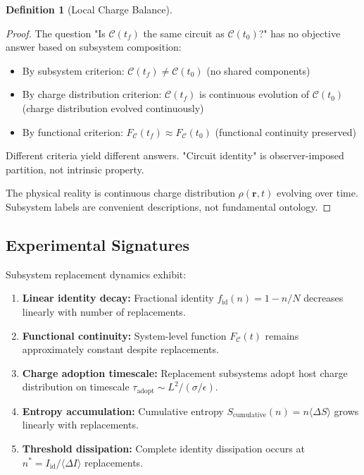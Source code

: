 \documentclass[12pt,a4paper]{article}
\theoremstyle{plain}
\theoremstyle{definition}
\newtheorem{definition}[theorem]{Definition}
\theoremstyle{remark}
\begin{document}
\begin{definition}[Local Charge Balance]
\begin{proof}
The question "Is $\mathcal{C}(t_f)$ the same circuit as $\mathcal{C}(t_0)$?" has no objective answer based on subsystem composition:
\begin{itemize}
\item By subsystem criterion: $\mathcal{C}(t_f) \neq \mathcal{C}(t_0)$ (no shared components)
\item By charge distribution criterion: $\mathcal{C}(t_f)$ is continuous evolution of $\mathcal{C}(t_0)$ (charge distribution evolved continuously)
\item By functional criterion: $F_{\mathcal{C}}(t_f) \approx F_{\mathcal{C}}(t_0)$ (functional continuity preserved)
\end{itemize}

Different criteria yield different answers. "Circuit identity" is observer-imposed partition, not intrinsic property.

The physical reality is continuous charge distribution $\rho(\mathbf{r},t)$ evolving over time. Subsystem labels are convenient descriptions, not fundamental ontology.
\end{proof}

\subsection{Experimental Signatures}

Subsystem replacement dynamics exhibit:

\begin{enumerate}
\item \textbf{Linear identity decay:} Fractional identity $f_{\text{id}}(n) = 1 - n/N$ decreases linearly with number of replacements.

\item \textbf{Functional continuity:} System-level function $F_{\mathcal{C}}(t)$ remains approximately constant despite replacements.

\item \textbf{Charge adoption timescale:} Replacement subsystems adopt host charge distribution on timescale $\tau_{\text{adopt}} \sim L^2 / (\sigma/\epsilon)$.

\item \textbf{Entropy accumulation:} Cumulative entropy $S_{\text{cumulative}}(n) = n \langle \Delta S \rangle$ grows linearly with replacements.

\item \textbf{Threshold dissipation:} Complete identity dissipation occurs at $n^* = I_{\text{id}} / \langle \Delta I \rangle$ replacements.
\end{enumerate}

\end{definition}
\end{document}
